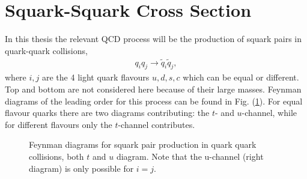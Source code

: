 \documentclass[twoside,english]{uiofysmaster}
\begin{document}
\section{Squark-Squark Cross Section}
In this thesis the relevant QCD process will be the production of squark pairs in quark-quark collisions,
\begin{align}
q_i q_j \rightarrow \tilde{q}_i \tilde{q}_j,
\end{align}
where $i,j$ are the 4 light quark flavours $u, d, s, c$ which can be equal or different. Top and bottom are not considered here because of their large masses. Feynman diagrams of the leading order for this process can be found in Fig. (\ref{Fig:: susy hadron : Feynman qq}). For equal flavour quarks there are two diagrams contributing: the $t$- and $u$-channel, while for different flavours only the $t$-channel contributes.

\begin{figure}
\centering
{}
\caption{Feynman diagrams for squark pair production in quark quark collisions, both $t$ and $u$ diagram. Note that the u-channel (right diagram) is only possible for $i=j$.}
\label{Fig:: susy hadron : Feynman qq}
\end{figure}


\end{document}
